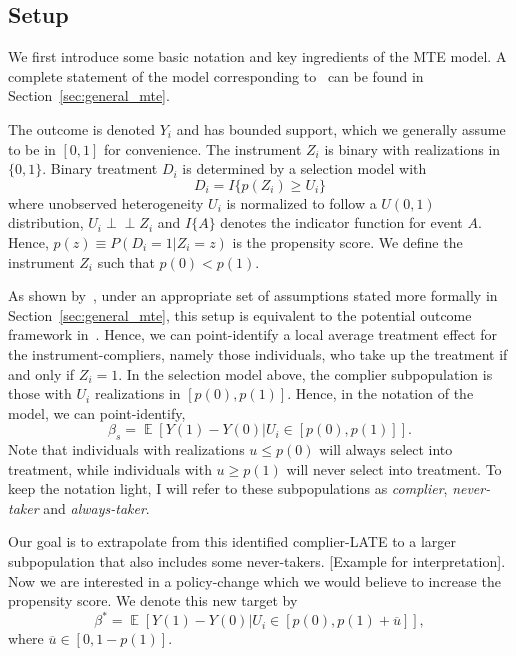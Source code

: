 \documentclass[12pt,a4paper,english]{article} %
\DeclareMathOperator*{\E}{\mathbb{E}}
\newcommand{\indep}{\perp\!\!\!\!\perp}
\numberwithin{equation}{section}
\numberwithin{figure}{section}
\numberwithin{table}{section}
\begin{document}
\subsection{Setup}
We first introduce some basic notation and key ingredients of the MTE model.
A complete statement of the model corresponding to~\cite{mogstad2018using} can be found in Section~\ref{sec:general_mte}.

The outcome is denoted $Y_i$ and has bounded support, which we generally assume to be in $[0,1]$ for convenience.
The instrument $Z_i$ is binary with realizations in $\{0,1\}$.
Binary treatment $D_i$ is determined by a selection model with
\begin{equation}\label{eq:treatment}
  D_i = I\{p(Z_i) \geq U_i\}
\end{equation}
where unobserved heterogeneity $U_i$ is normalized to follow a $U(0,1)$ distribution, $U_i \indep Z_i$ and $I\{A\}$ denotes the indicator function for event $A$.
Hence, $p(z) \equiv P(D_i=1|Z_i=z)$ is the propensity score. We define the instrument $Z_i$ such that $p(0)<p(1)$.

As shown by~\cite{vytlacil2002independence}, under an appropriate set of assumptions stated more formally in Section~\ref{sec:general_mte}, this setup is equivalent to the potential outcome framework in~\cite{imbens_angrist1994ecma}.
Hence, we can point-identify a local average treatment effect for the instrument-compliers, namely those individuals, who take up the treatment if and only if $Z_i=1$.
In the selection model above, the complier subpopulation is those with $U_i$ realizations in $[p(0), p(1)]$.
Hence, in the notation of the model, we can point-identify,
\begin{equation}
  \beta_s = \E[Y(1) - Y(0)|U_i\in[p(0), p(1)]].
\end{equation}
Note that individuals with realizations $u \leq p(0)$ will always select into treatment, while individuals with $u \geq p(1)$ will never select into treatment.
To keep the notation light, I will refer to these subpopulations as \textit{complier}, \textit{never-taker} and \textit{always-taker}.

Our goal is to extrapolate from this identified complier-LATE to a larger subpopulation that also includes some never-takers.
[Example for interpretation]. Now we are interested in a policy-change which we would believe to increase the propensity score.
We denote this new target by
\begin{equation}
  \beta^* = \E[Y(1) - Y(0)|U_i \in[p(0), p(1) + \overline{u}]],
\end{equation}
where $\overline{u}\in[0, 1-p(1)]$.
\end{document}

